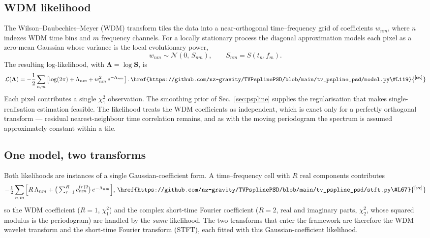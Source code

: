 \documentclass[
  aps,
  prd,
  twocolumn,
  amsmath,
  amssymb,
  nofootinbib,
  superscriptaddress,
  longbibliography,
]{revtex4-2}
\newcommand{\repobase}{https://github.com/nz-gravity/TVPsplinePSD/blob/main}
\DeclareRobustCommand{\codelink}[1]{\,\href{\repobase/#1}{\textsuperscript{\scriptsize\sffamily[src]}}}
\begin{document}
\subsection{WDM likelihood}
\label{sec:wdm}

The Wilson--Daubechies--Meyer (WDM) transform \citep{cornish2020Wavelets} tiles
the data into a near-orthogonal time--frequency grid of coefficients $w_{nm}$,
where $n$ indexes WDM time bins and $m$ frequency channels. For a locally
stationary process the diagonal approximation models each pixel as a zero-mean
Gaussian whose variance is the local evolutionary power,
\begin{equation}
w_{nm}\sim\mathcal{N}\!\left(0,\,S_{nm}\right),
\qquad S_{nm} = S(t_n, f_m).
\end{equation}
The resulting log-likelihood, with $\bm{\Lambda} = \log\mathbf{S}$, is
\begin{equation}
\mathcal{L}(\bm{\Lambda})
= -\frac{1}{2}\sum_{n,m}
\left[\log(2\pi) + \Lambda_{nm} + w_{nm}^2\,e^{-\Lambda_{nm}}\right].
\codelink{tv_pspline_psd/model.py\#L119}
\label{eq:wdm_like}
\end{equation}
Each pixel contributes a single $\chi^2_1$ observation. The smoothing prior of
Sec.~\ref{sec:pspline} supplies the regularisation that makes single-realisation
estimation feasible. The likelihood treats the WDM coefficients as independent,
which is exact only for a perfectly orthogonal transform --- residual
nearest-neighbour time correlation remains, and as with the moving periodogram
the spectrum is assumed approximately constant within a tile.

\subsection{One model, two transforms}
\label{sec:unified}

Both likelihoods are instances of a single Gaussian-coefficient form. A
time--frequency cell with $R$ real components contributes
\begin{equation}
-\tfrac{1}{2}\sum_{n,m}\Big[R\,\Lambda_{nm}
+ \big(\textstyle\sum_{r=1}^{R} c^{(r)2}_{nm}\big)\,e^{-\Lambda_{nm}}\Big],
\codelink{tv_pspline_psd/stft.py\#L67}
\label{eq:unified}
\end{equation}
so the WDM coefficient ($R=1$, $\chi^2_1$) and the complex short-time Fourier
coefficient ($R=2$, real and imaginary parts, $\chi^2_2$, whose squared modulus
is the periodogram) are handled by the \emph{same} likelihood. The two transforms
that enter the framework are therefore the WDM wavelet transform and the
short-time Fourier transform (STFT), each fitted with this Gaussian-coefficient
likelihood.
\end{document}
